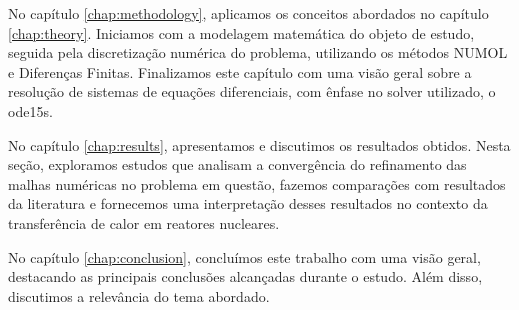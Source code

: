 No capítulo \ref{chap:methodology}, aplicamos os conceitos abordados no capítulo \ref{chap:theory}. Iniciamos com a modelagem matemática do objeto de estudo, seguida pela discretização numérica do problema, utilizando os métodos NUMOL e Diferenças Finitas. Finalizamos este capítulo com uma visão geral sobre a resolução de sistemas de equações diferenciais, com ênfase no solver utilizado, o ode15s.

No capítulo \ref{chap:results}, apresentamos e discutimos os resultados obtidos. Nesta seção, exploramos estudos que analisam a convergência do refinamento das malhas numéricas no problema em questão, fazemos comparações com resultados da literatura e fornecemos uma interpretação desses resultados no contexto da transferência de calor em reatores nucleares.

No capítulo \ref{chap:conclusion}, concluímos este trabalho com uma visão geral, destacando as principais conclusões alcançadas durante o estudo. Além disso, discutimos a relevância do tema abordado.

